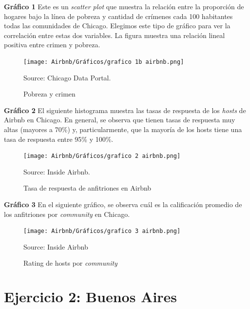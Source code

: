 \documentclass[11pt]{article}
\newcommand{\source}[1]{\caption*{Source: {#1}} }
\begin{document}
\newpage

\textbf{Gráfico 1} Este es un \textit{scatter plot} que muestra la relación entre la proporción de hogares bajo la línea de pobreza y cantidad de crímenes cada 100 habitantes todas las comunidades de Chicago. Elegimos este tipo de gráfico para ver la correlación entre estas dos variables. La figura muestra una relación lineal positiva entre crimen y pobreza.

\begin{figure}[H]
    \centering
    \caption{Pobreza y crimen}
    \texttt{[image: Airbnb/Gráficos/grafico 1b airbnb.png]}
    \source{Chicago Data Portal.}
    \label{fig:pob_cri}
\end{figure}

\textbf{Gráfico 2} El siguiente histograma muestra las tasas de respuesta de los \textit{hosts} de Airbnb en Chicago. En general, se observa que tienen tasas de respuesta muy altas (mayores a 70\%) y, particularmente, que la mayoría de los hosts tiene una tasa de respuesta entre 95\% y 100\%.

\begin{figure}[H]
    \centering
    \caption{Tasa de respuesta de anfitriones en Airbnb}
    \texttt{[image: Airbnb/Gráficos/grafico 2 airbnb.png]}
    \source{Inside Airbnb.}
    \label{fig:response}
\end{figure}

\newpage
\textbf{Gráfico 3} En el siguiente gráfico, se observa cuál es la calificación promedio de los anfitriones por \textit{community} en Chicago. 

\begin{figure}[H]
    \centering
    \caption{Rating de hosts por \textit{community}}
    \texttt{[image: Airbnb/Gráficos/grafico 3 airbnb.png]}
    \source{Inside Airbnb}
    \label{fig:rating}
\end{figure}

\section*{Ejercicio 2: Buenos Aires} 
\end{document}
